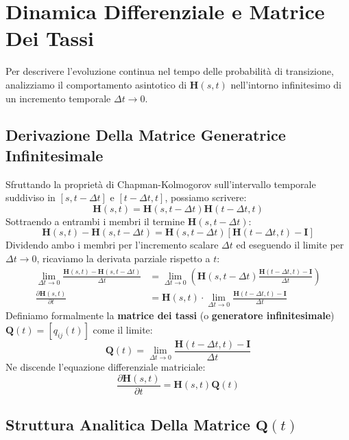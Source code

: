 \documentclass[11pt, a4paper]{article}
\begin{document}

\section{Dinamica Differenziale e Matrice Dei Tassi}

Per descrivere l'evoluzione continua nel tempo delle probabilità di transizione, analizziamo il comportamento asintotico di $\bm{H}(s, t)$ nell'intorno infinitesimo di un incremento temporale $\Delta t \to 0$.

\subsection{Derivazione Della Matrice Generatrice Infinitesimale}

Sfruttando la proprietà di Chapman-Kolmogorov sull'intervallo temporale suddiviso in $[s, t - \Delta t]$ e $[t - \Delta t, t]$, possiamo scrivere:
\[
    \bm{H}(s, t) = \bm{H}(s, t - \Delta t) \bm{H}(t - \Delta t, t)
\]
Sottraendo a entrambi i membri il termine $\bm{H}(s, t - \Delta t)$:
\[
    \bm{H}(s, t) - \bm{H}(s, t - \Delta t) = \bm{H}(s, t - \Delta t) \left[ \bm{H}(t - \Delta t, t) - \bm{I} \right]
\]
Dividendo ambo i membri per l'incremento scalare $\Delta t$ ed eseguendo il limite per $\Delta t \to 0$, ricaviamo la derivata parziale rispetto a $t$:
\begin{align*}
    \lim_{\Delta t \to 0} \frac{\bm{H}(s, t) - \bm{H}(s, t - \Delta t)}{\Delta t} &= \lim_{\Delta t \to 0} \left( \bm{H}(s, t - \Delta t) \frac{\bm{H}(t - \Delta t, t) - \bm{I}}{\Delta t} \right) \\
    \frac{\partial \bm{H}(s, t)}{\partial t} &= \bm{H}(s, t) \cdot \lim_{\Delta t \to 0} \frac{\bm{H}(t - \Delta t, t) - \bm{I}}{\Delta t}
\end{align*}
Definiamo formalmente la \textbf{matrice dei tassi} (o \textbf{generatore infinitesimale}) $\bm{Q}(t) = [q_{ij}(t)]$ come il limite:
\[
    \boxed{\bm{Q}(t) = \lim_{\Delta t \to 0} \frac{\bm{H}(t - \Delta t, t) - \bm{I}}{\Delta t}}
\]
Ne discende l'equazione differenziale matriciale:
\[
    \boxed{\frac{\partial \bm{H}(s, t)}{\partial t} = \bm{H}(s, t) \bm{Q}(t)}
\]

\subsection{Struttura Analitica Della Matrice \texorpdfstring{$\bm{Q}(t)$}{Q(t)}}
\end{document}
